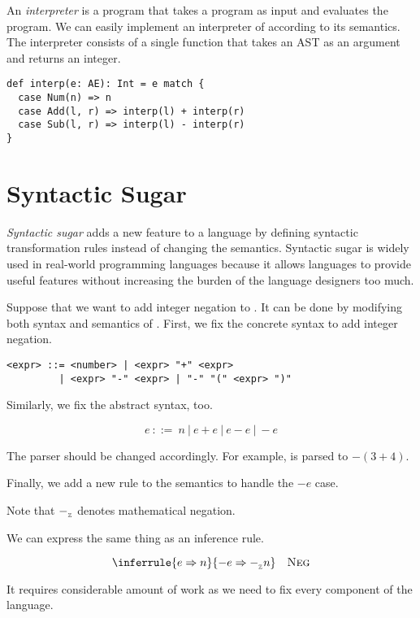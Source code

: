 An \textit{interpreter} is a program that takes a program as
input and evaluates the program. We can easily implement an interpreter of
\Lang according to its semantics. The interpreter consists of a single function
that takes an AST as an argument and returns an integer.

\begin{verbatim}
def interp(e: AE): Int = e match {
  case Num(n) => n
  case Add(l, r) => interp(l) + interp(r)
  case Sub(l, r) => interp(l) - interp(r)
}
\end{verbatim}

\section{Syntactic Sugar}

\textit{Syntactic sugar} adds a new feature to a language
by defining syntactic transformation rules instead of changing the semantics.
Syntactic sugar is widely used in real-world programming languages because it
allows languages to provide useful features without increasing the burden of the
language designers too much.

Suppose that we want to add integer negation to \Lang. It can be done by
modifying both syntax and semantics of \Lang. First, we fix the concrete syntax
to add integer negation.

\begin{verbatim}
<expr> ::= <number> | <expr> "+" <expr>
         | <expr> "-" <expr> | "-" "(" <expr> ")"
\end{verbatim}

Similarly, we fix the abstract syntax, too.

\[e\ ::=\ n\ |\ e+e\ |\ e-e\ |\ -e\]

The parser should be changed accordingly. For example,  is parsed
to $-(3+4)$.

Finally, we add a new rule to the semantics to handle the $-e$ case.


Note that $-_{{}_{\mathbb{Z}}}$ denotes mathematical negation.

We can express the same thing as an inference rule.

\[
  \inferrule
  { e\Rightarrow n}
  { -e\Rightarrow\isub n }
  \quad\textsc{Neg}
\]

It requires considerable amount of work as we need to fix every component of the language.

